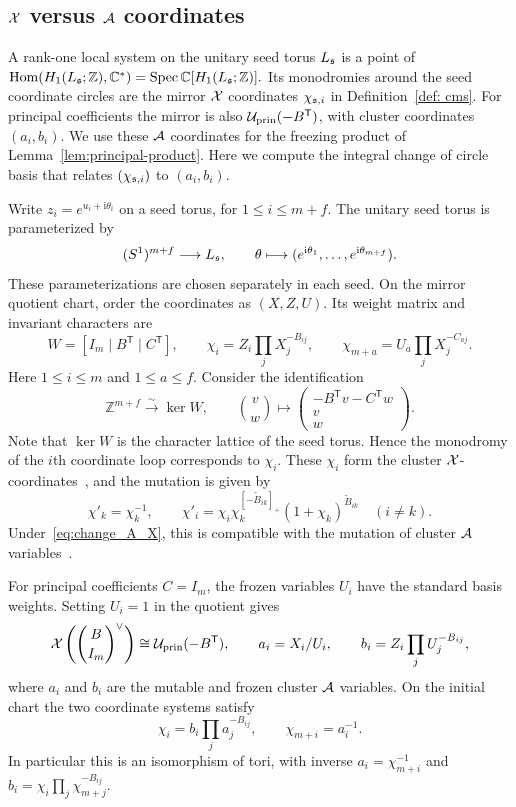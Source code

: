 \documentclass[12pt, letter]{amsart}
\theoremstyle{definition}
\newcommand{\Z}{\mathbb Z}
\newcommand{\pr}{\mathrm{prin}}
\numberwithin{equation}{section}
\begin{document}
\subsection{\(\mathcal{X}\) versus \(\mathcal{A}\) coordinates}\label{sec:mirror-coordinates}

A rank-one local system on the unitary seed torus $L_{\mathfrak{s}}$ is a point of
$\operatorname{Hom}(H_1(L_\fs;\Z),\C^*)
 =\Spec\C[H_1(L_\fs;\Z)].$
Its monodromies around the seed coordinate circles are the mirror \(\mathcal{X}\)
coordinates $\chi_{\mathfrak{s},i}$ in Definition~\ref{def: cms}.
For principal coefficients the mirror is also
$\cU_{\pr}(-B^{\mathsf T})$, with cluster coordinates $(a_i,b_i)$.
We use these $\mathcal{A}$ coordinates for the freezing product of
Lemma~\ref{lem:principal-product}. 
Here we compute the integral change of circle basis that relates
$(\chi_{\mathfrak{s},i})$ to $(a_i,b_i)$. 

Write $z_i=e^{u_i+\mathrm i\theta_i}$ on a seed torus, for $1\le i\le m+f$.
The unitary seed torus is parameterized by
\[
 (S^1)^{m+f}\longrightarrow L_{\mathfrak{s}},\qquad
 \theta\longmapsto(e^{\mathrm i\theta_1},\ldots,e^{\mathrm i\theta_{m+f}}).
\]
These parameterizations are chosen separately in each seed.
On the mirror quotient chart, order the coordinates as $(X,Z,U)$.
Its weight matrix and invariant characters are
\begin{equation}
\label{eq:change_A_X}
 W=[I_m\mid B^{\mathsf T}\mid C^{\mathsf T}],\qquad
 \chi_i=Z_i\prod_jX_j^{-B_{ij}},\qquad
 \chi_{m+a}=U_a\prod_jX_j^{-C_{aj}}.
\end{equation}
Here $1\leq i\leq m$ and $1\leq a\leq f$.
Consider the identification 
\[
 \Z^{m+f}\xrightarrow{\sim}\ker W,\qquad
 \binom vw\longmapsto
 \begin{pmatrix}-B^{\mathsf T}v-C^{\mathsf T}w\\v\\w\end{pmatrix}.
\]
Note that \(\ker W\) is the character lattice of the seed torus. Hence the monodromy of the $i$th coordinate loop corresponds to $\chi_i$. These \(\chi_i\) form the cluster \(\mathcal{X}\)-coordinates~\cite{FG09}, and the mutation is given by
\[
 \chi'_k=\chi_k^{-1},\qquad
 \chi'_i=\chi_i\chi_k^{[-\widetilde B_{ik}]_+}
                  (1+\chi_k)^{\widetilde B_{ik}}\quad(i\ne k).
\]
Under~\eqref{eq:change_A_X}, this is compatible with the mutation of cluster \(\mathcal{A}\) variables~\cite[Proposition 2.2]{FG09}.

For principal coefficients $C=I_m$, the frozen variables $U_i$ have
the standard basis weights. Setting $U_i=1$ in the quotient gives
\[
 \cX\left(\binom{B}{I_m}^{\vee}\right)
 \cong\cU_{\pr}(-B^{\mathsf T}),\qquad
 a_i=X_i/U_i,\qquad b_i=Z_i\prod_jU_j^{-B_{ij}},
\]
where $a_i$ and \(b_i\) are the mutable and frozen cluster \(\mathcal{A}\) variables.
On the initial chart the two coordinate systems satisfy
\begin{equation}\label{eq:principal-XA}
 \chi_i=b_i\prod_j a_j^{-B_{ij}},\qquad
 \chi_{m+i}=a_i^{-1}.
\end{equation}
In particular this is an isomorphism of tori, with inverse
$a_i=\chi_{m+i}^{-1}$ and
$b_i=\chi_i\prod_j\chi_{m+j}^{-B_{ij}}$.
\end{document}

